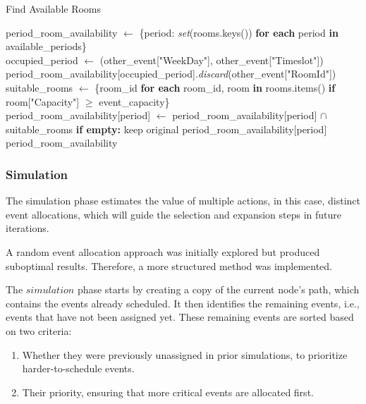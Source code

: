 \begin{algorithm}
\caption{Find Available Rooms}\label{find_available_rooms}
\begin{algorithmic}[1]
    \State period\_room\_availability $\gets$ \{period: \textit{set}(rooms.keys()) \textbf{for each} period \textbf{in} available\_periods\}
    \\
        \State occupied\_period $\gets$ (other\_event["WeekDay"], other\_event["Timeslot"])
            \State period\_room\_availability[occupied\_period].\textit{discard}(other\_event["RoomId"])
        \EndIf
    \EndFor
    \\
    \State suitable\_rooms $\gets$ \{room\_id \textbf{for each} room\_id, room \textbf{in} rooms.items() \textbf{if} room["Capacity"] $\geq$ event\_capacity\}
    \\
            \State period\_room\_availability[period] $\gets$ period\_room\_availability[period] $\cap$ suitable\_rooms 
            \State \textbf{if empty:} keep original period\_room\_availability[period]
        \EndIf
    \EndFor
    \\
    \State \Return period\_room\_availability
\EndFunction
\end{algorithmic}
\end{algorithm}

\subsubsection{Simulation}

The simulation phase estimates the value of multiple actions, in this case, distinct event allocations, which will guide the selection and expansion steps in future iterations. 

A random event allocation approach was initially explored but produced suboptimal results. Therefore, a more structured method was implemented.

The \(simulation\) phase starts by creating a copy of the current node's path, which contains the events already scheduled. It then identifies the remaining events, i.e., events that have not been assigned yet. These remaining events are sorted based on two criteria:
\begin{enumerate}
\item Whether they were previously unassigned in prior simulations, to prioritize harder-to-schedule events.
\item Their priority, ensuring that more critical events are allocated first.
\end{enumerate}

